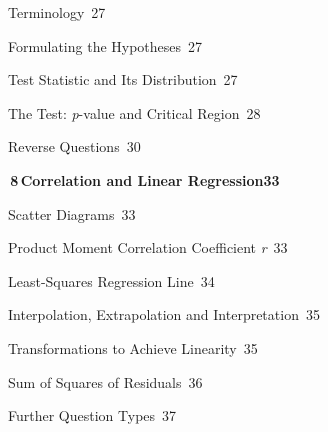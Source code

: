 {{\noindent{}\quad Terminology\dotfill\ 27\par
\noindent{}\quad Formulating the Hypotheses\dotfill\ 27\par
\noindent{}\quad Test Statistic and Its Distribution\dotfill\ 27\par
\noindent{}\quad The Test: \textit{p}-value and Critical Region\dotfill\ 28\par
\noindent{}\quad Reverse Questions\dotfill\ 30\par
\vspace{0.4mm}\noindent\colorbox{blue!8}{\parbox{\dimexpr\textwidth-2\fboxsep}{\large\bfseries\color{blue!50!black}\colorbox{blue!50!black}{\color{white}\,8\,}\quad Correlation and Linear Regression\hfill 33}}\par\vspace{0.3mm}
\noindent{}\quad Scatter Diagrams\dotfill\ 33\par
\noindent{}\quad Product Moment Correlation Coefficient \textit{r}\dotfill\ 33\par
\noindent{}\quad Least-Squares Regression Line\dotfill\ 34\par
\noindent{}\quad Interpolation, Extrapolation and Interpretation\dotfill\ 35\par
\noindent{}\quad Transformations to Achieve Linearity\dotfill\ 35\par
\noindent{}\quad Sum of Squares of Residuals\dotfill\ 36\par
\noindent{}\quad Further Question Types\dotfill\ 37\par
}

}
